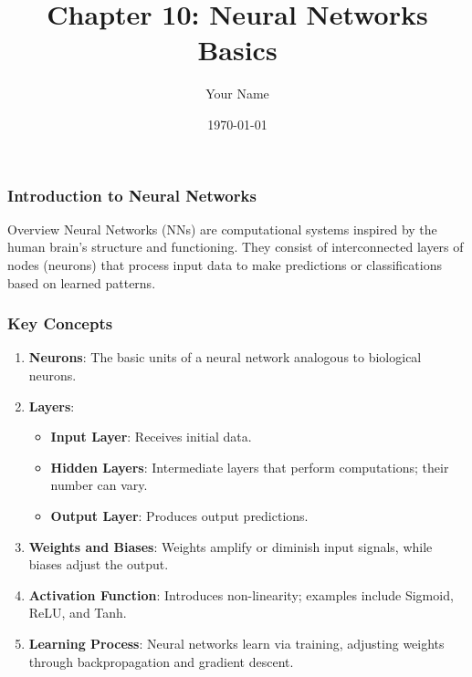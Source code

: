 \documentclass{beamer}
\title{Chapter 10: Neural Networks Basics}
\author{Your Name}
\institute{Your Institution}
\date{\today}
\begin{document}
\frame{\titlepage}

\begin{frame}[fragile]
    \frametitle{Introduction to Neural Networks}
    
    \begin{block}{Overview}
        Neural Networks (NNs) are computational systems inspired by the human brain's structure and functioning. They consist of interconnected layers of nodes (neurons) that process input data to make predictions or classifications based on learned patterns.
    \end{block}
\end{frame}

\begin{frame}[fragile]
    \frametitle{Key Concepts}
    
    \begin{enumerate}
        \item \textbf{Neurons}: The basic units of a neural network analogous to biological neurons.
        \item \textbf{Layers}:
            \begin{itemize}
                \item \textbf{Input Layer}: Receives initial data.
                \item \textbf{Hidden Layers}: Intermediate layers that perform computations; their number can vary.
                \item \textbf{Output Layer}: Produces output predictions.
            \end{itemize}
        \item \textbf{Weights and Biases}: Weights amplify or diminish input signals, while biases adjust the output.
        \item \textbf{Activation Function}: Introduces non-linearity; examples include Sigmoid, ReLU, and Tanh.
        \item \textbf{Learning Process}: Neural networks learn via training, adjusting weights through backpropagation and gradient descent.
    \end{enumerate}
\end{frame}
\end{document}

